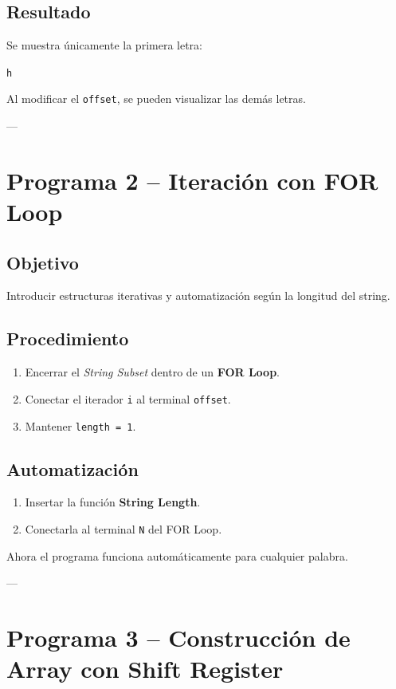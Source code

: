 \documentclass[12pt]{article}
\begin{document}
\subsection*{Resultado}

Se muestra únicamente la primera letra:

\begin{center}
\texttt{h}
\end{center}

Al modificar el \texttt{offset}, se pueden visualizar las demás letras.

---

\section{Programa 2 – Iteración con FOR Loop}

\subsection*{Objetivo}
Introducir estructuras iterativas y automatización según la longitud del string.

\subsection*{Procedimiento}

\begin{enumerate}
    \item Encerrar el \textit{String Subset} dentro de un \textbf{FOR Loop}.
    \item Conectar el iterador \texttt{i} al terminal \texttt{offset}.
    \item Mantener \texttt{length = 1}.
\end{enumerate}

\subsection*{Automatización}

\begin{enumerate}
    \item Insertar la función \textbf{String Length}.
    \item Conectarla al terminal \texttt{N} del FOR Loop.
\end{enumerate}

Ahora el programa funciona automáticamente para cualquier palabra.

---

\section{Programa 3 – Construcción de Array con Shift Register}
\end{document}
